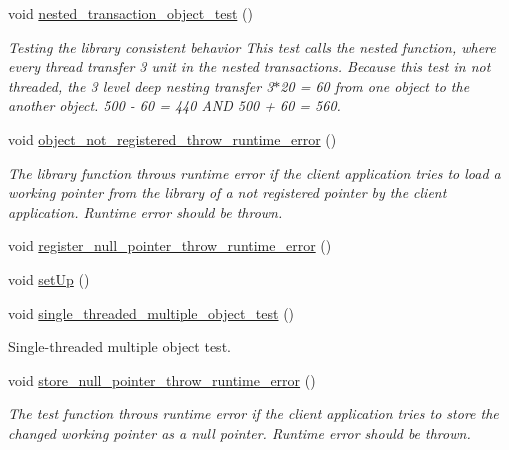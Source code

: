 \begin{DoxyCompactItemize}
void \hyperlink{class_my_test_c_ase_ad5d3718a6ed5ef68ad711456d6defd62_ad5d3718a6ed5ef68ad711456d6defd62}{nested\+\_\+transaction\+\_\+object\+\_\+test} ()
\begin{DoxyCompactList}\small\item\em Testing the library consistent behavior This test calls the nested function, where every thread transfer 3 unit in the nested transactions. Because this test in not threaded, the 3 level deep nesting transfer 3$\ast$20 = 60 from one object to the another object. 500 -\/ 60 = 440 A\+ND 500 + 60 = 560. \end{DoxyCompactList}\item 
void \hyperlink{class_my_test_c_ase_aa3a8c942db63dcf082f85013b7a09ee1_aa3a8c942db63dcf082f85013b7a09ee1}{object\+\_\+not\+\_\+registered\+\_\+throw\+\_\+runtime\+\_\+error} ()
\begin{DoxyCompactList}\small\item\em The library function throws runtime error if the client application tries to load a working pointer from the library of a not registered pointer by the client application. Runtime error should be thrown. \end{DoxyCompactList}\item 
void \hyperlink{class_my_test_c_ase_a80f9123880a0b79e4119f2f4699847ec_a80f9123880a0b79e4119f2f4699847ec}{register\+\_\+null\+\_\+pointer\+\_\+throw\+\_\+runtime\+\_\+error} ()
\item 
void \hyperlink{class_my_test_c_ase_a387cf3ea316c793a7b5f34418a2ee3d4_a387cf3ea316c793a7b5f34418a2ee3d4}{set\+Up} ()
\item 
void \hyperlink{class_my_test_c_ase_a2f75b781b07bdbc3649c10d6845cb3cc_a2f75b781b07bdbc3649c10d6845cb3cc}{single\+\_\+threaded\+\_\+multiple\+\_\+object\+\_\+test} ()
\begin{DoxyCompactList}\small\item\em 
\begin{DoxyEnumerate}
\item Single-\/threaded multiple object test. 
\end{DoxyEnumerate}\end{DoxyCompactList}\item 
void \hyperlink{class_my_test_c_ase_aae8eeb07dfdc5411255b064bc57b855d_aae8eeb07dfdc5411255b064bc57b855d}{store\+\_\+null\+\_\+pointer\+\_\+throw\+\_\+runtime\+\_\+error} ()
\begin{DoxyCompactList}\small\item\em The test function throws runtime error if the client application tries to store the changed working pointer as a null pointer. Runtime error should be thrown. \end{DoxyCompactList}\item 

\end{DoxyCompactItemize}
